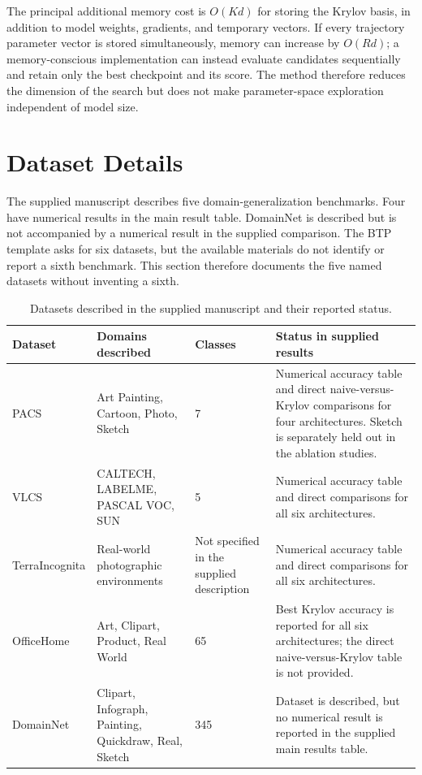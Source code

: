 \documentclass[11pt,a4paper]{article}
\begin{document}
The principal additional memory cost is $O(Kd)$ for storing the Krylov basis, in addition to model weights, gradients, and temporary vectors. If every trajectory parameter vector is stored simultaneously, memory can increase by $O(Rd)$; a memory-conscious implementation can instead evaluate candidates sequentially and retain only the best checkpoint and its score. The method therefore reduces the dimension of the search but does not make parameter-space exploration independent of model size.

\section{Dataset Details}

The supplied manuscript describes five domain-generalization benchmarks. Four have numerical results in the main result table. DomainNet is described but is not accompanied by a numerical result in the supplied comparison. The BTP template asks for six datasets, but the available materials do not identify or report a sixth benchmark. This section therefore documents the five named datasets without inventing a sixth.

\begin{table}[H]
\centering
\caption{Datasets described in the supplied manuscript and their reported status.}
\label{tab:datasets}
\small
\begin{tabularx}{\textwidth}{p{2.6cm}p{2.5cm}p{2.0cm}X}
\toprule
Dataset & Domains described & Classes & Status in supplied results \\
\midrule
PACS & Art Painting, Cartoon, Photo, Sketch & 7 & Numerical accuracy table and direct naive-versus-Krylov comparisons for four architectures. Sketch is separately held out in the ablation studies. \\
VLCS & CALTECH, LABELME, PASCAL VOC, SUN & 5 & Numerical accuracy table and direct comparisons for all six architectures. \\
TerraIncognita & Real-world photographic environments & Not specified in the supplied description & Numerical accuracy table and direct comparisons for all six architectures. \\
OfficeHome & Art, Clipart, Product, Real World & 65 & Best Krylov accuracy is reported for all six architectures; the direct naive-versus-Krylov table is not provided. \\
DomainNet & Clipart, Infograph, Painting, Quickdraw, Real, Sketch & 345 & Dataset is described, but no numerical result is reported in the supplied main results table. \\
\bottomrule
\end{tabularx}
\end{table}
\end{document}
